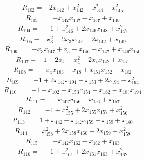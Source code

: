 \begin{align*}
R_{102}={}& 2x_{142} + x_{142}^{2} + x_{144}^{2} - x_{145}^{2}
\end{align*}
\begin{align*}
R_{103}={}& -x_{142}x_{147} - x_{147} + x_{148}
\end{align*}
\begin{align*}
R_{104}={}& -1 + x_{146}^{2} + 2x_{146}x_{148} + x_{147}^{2}
\end{align*}
\begin{align*}
R_{105}={}& x_{3}^{2} - 2x_{3}x_{142} - 2x_{142} + x_{149}
\end{align*}
\begin{align*}
R_{106}={}& -x_{3}x_{147} + x_{5} - x_{146} - x_{147} + x_{149}x_{150}
\end{align*}
\begin{align*}
R_{107}={}& 1 - 2x_{4} + x_{4}^{2} - 2x_{4}x_{142} + x_{151}
\end{align*}
\begin{align*}
R_{108}={}& -x_{4}x_{183} + x_{18} + x_{151}x_{152} - x_{182}
\end{align*}
\begin{align*}
R_{109}={}& -1 + 2x_{142}x_{194} - x_{153} + 2x_{194} - x_{194}^{2}
\end{align*}
\begin{align*}
R_{110}={}& -1 + x_{102} + x_{153}x_{154} - x_{182} - x_{183}x_{194}
\end{align*}
\begin{align*}
R_{111}={}& -x_{142}x_{156} - x_{156} + x_{157}
\end{align*}
\begin{align*}
R_{112}={}& -1 + x_{155}^{2} + 2x_{155}x_{157} + x_{156}^{2}
\end{align*}
\begin{align*}
R_{113}={}& 1 + x_{142} - x_{142}x_{159} - x_{159} + x_{160}
\end{align*}
\begin{align*}
R_{114}={}& x_{158}^{2} + 2x_{158}x_{160} - 2x_{159} + x_{159}^{2}
\end{align*}
\begin{align*}
R_{115}={}& -x_{142}x_{162} - x_{162} + x_{163}
\end{align*}
\begin{align*}
R_{116}={}& -1 + x_{161}^{2} + 2x_{161}x_{163} + x_{162}^{2}
\end{align*}

